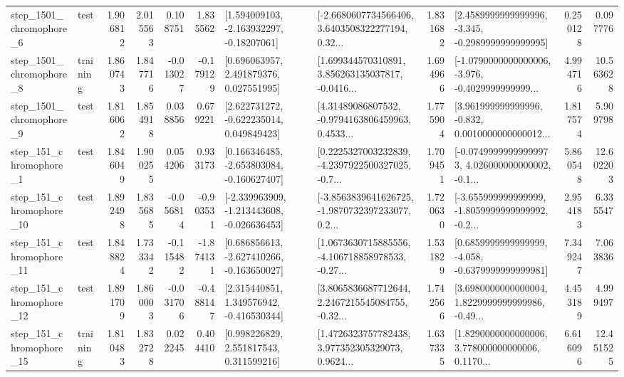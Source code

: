 \begin{tabular}{llrrrrllrlrr}
  step\_1501\_chromophore\_6 &      test &      1.906812 &    2.015563 &      0.108751 &  1.835562 &    [1.594009103, -2.163932297, -0.18207061] &  [-2.6680607734566406, 3.6403508322277194, 0.32... &       1.831682 &  [2.4589999999999996, -3.345, -0.2989999999999995] &            0.250128 &          0.097776 \\
  step\_1501\_chromophore\_8 &  training &      1.860743 &    1.847716 &     -0.013027 & -0.179129 &     [0.696063957, 2.491879376, 0.027551995] &  [1.699344570310891, 3.856263135037817, -0.0416... &       1.694966 &  [-1.0790000000000006, -3.976, -0.4029999999999... &            4.994716 &         10.563628 \\
  step\_1501\_chromophore\_9 &      test &      1.816062 &    1.854918 &      0.038856 &  0.679221 &    [2.622731272, -0.622235014, 0.049849423] &  [4.31489086807532, -0.9794163806459963, 0.4533... &       1.775904 &  [3.961999999999996, -0.832, 0.0010000000000012... &            1.817574 &          5.909798 \\
   step\_151\_chromophore\_1 &      test &      1.846049 &    1.900255 &      0.054206 &  0.933173 &   [0.166346485, -2.653803084, -0.160627407] &  [0.2225327003232839, -4.2397922500327025, -0.7... &       1.709451 &  [-0.07499999999999973, 4.026000000000002, -0.1... &            5.860548 &         12.602203 \\
  step\_151\_chromophore\_10 &      test &      1.892498 &    1.835685 &     -0.056814 & -0.903531 &  [-2.339963909, -1.213443608, -0.026636453] &  [-3.8563839641626725, -1.9870732397233077, 0.2... &       1.720630 &  [-3.655999999999999, -1.8059999999999992, -0.2... &            2.954183 &          6.335547 \\
  step\_151\_chromophore\_11 &      test &      1.848824 &    1.733342 &     -0.115482 & -1.874131 &   [0.686856613, -2.627410266, -0.163650027] &  [1.0673630715885556, -4.106718858978533, -0.27... &       1.531829 &  [0.6859999999999999, -4.058, -0.6379999999999981] &            7.349247 &          7.063836 \\
  step\_151\_chromophore\_12 &      test &      1.891709 &    1.860003 &     -0.031706 & -0.488147 &    [2.315440851, 1.349576942, -0.416530344] &  [3.8065836687712644, 2.2467215545084755, -0.32... &       1.742566 &  [3.6980000000000004, 1.8229999999999986, -0.49... &            4.453189 &          4.999497 \\
  step\_151\_chromophore\_15 &  training &      1.810483 &    1.832728 &      0.022245 &  0.404410 &     [0.998226829, 2.551817543, 0.311599216] &  [1.4726323757782438, 3.977352305329073, 0.9624... &       1.637335 &  [1.8290000000000006, 3.778000000000006, 0.1170... &            6.616096 &         12.451525 \\

\end{tabular}

